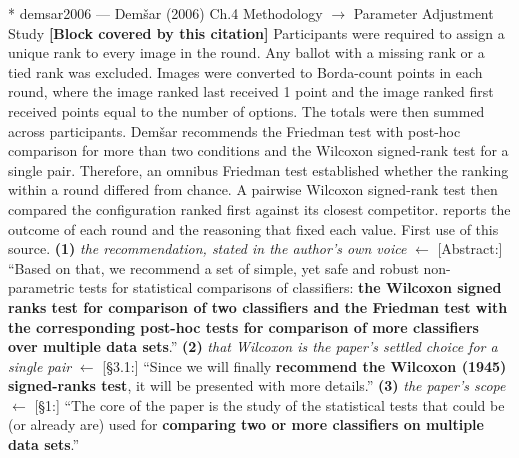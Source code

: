 \documentclass[11pt, a4paper]{article}
\makeatletter
\newcounter{citentry}
\newcommand{\citentry@core}[7]{%
  \stepcounter{citentry}
  \begingroup
  \sbox{\citentry@measurebox}{%
    \begin{minipage}{\linewidth}
      \noindent\colorbox{konstanzblue}{\parbox{\dimexpr\linewidth-2\fboxsep}{%
        \vspace{3pt}
        \textbf{\#\thecitentry \quad #2} \hfill \textit{#3}
        \vspace{3pt}
      }}
      \vspace{3pt}
      \noindent\begin{tabular}{@{}p{2.7cm} p{\dimexpr\linewidth-3cm}@{}}
        \textit{\small Sentence in thesis:} & #4 \\[5pt]
        \textbf{Usage:}\hfill       & #5 \\[5pt]
        \textit{\small Original source:}     & #6 \\[5pt]
        \textbf{How to check:}             & #7 \\
      \end{tabular}
      \vspace{5pt}
      \rule{10pt}{10pt}\quad \textbf{Validated} --- I have read the original and agree it supports the sentence.
    \end{minipage}%
  }%
  \Needspace{\dimexpr\ht\citentry@measurebox+\dp\citentry@measurebox\relax}%
  \endgroup
  \vspace{10pt}
  \noindent\colorbox{konstanzblue}{\parbox{\dimexpr\linewidth-2\fboxsep}{%
    \vspace{3pt}
    \textcolor{white}{\textbf{\#\thecitentry \quad #2}} \hfill \textcolor{white}{\textit{#3}}
    \vspace{3pt}
  }}
  \vspace{3pt}
  \noindent\begin{tabular}{@{}p{2.7cm} p{\dimexpr\linewidth-3cm}@{}}
    \textit{\small Sentence in thesis:} & \textcolor{darkgreen}{#4} \\[5pt]
    \textbf{Usage:}\hfill       & #5 \\[5pt]
    \textit{\small Original source:}     & \textcolor{darkred}{#6} \\[5pt]
    \textbf{How to check:}             & #7 \\
  \end{tabular}
  \vspace{5pt}
  \noindent\CheckBox[name=verified\thecitentry, width=10pt, height=10pt, bordercolor={0 0 0}, borderwidth=0.75, backgroundcolor={1 1 1}#1]{}\quad \textbf{Validated} --- I have read the original and agree it supports the sentence.
  \vspace{3pt}
  \noindent\textcolor{midgray}{\rule{\linewidth}{0.4pt}}
}
\newcommand{\citentry}{\@ifstar{\citentry@core{, checked}}{\citentry@core{}}}
\makeatother
\begin{document}
\begin{Form}
\citentry*
  {demsar2006 --- Dem\v{s}ar (2006)}
  {Ch.4 Methodology $\rightarrow$ Parameter Adjustment Study}
  {\textbf{[Block covered by this citation]} Participants were required to assign a unique rank to every image in the round. Any ballot with a missing rank or a tied rank was excluded. Images were converted to Borda-count points in each round, where the image ranked last received 1 point and the image ranked first received points equal to the number of options. The totals were then summed across participants. Dem\v{s}ar recommends the Friedman test with post-hoc comparison for more than two conditions and the Wilcoxon signed-rank test for a single pair. Therefore, an omnibus Friedman test established whether the ranking within a round differed from chance. A pairwise Wilcoxon signed-rank test then compared the configuration ranked first against its closest competitor. reports the outcome of each round and the reasoning that fixed each value.}
  {First use of this source.}
  {\textbf{(1)} \emph{the recommendation, stated in the author's own voice} $\leftarrow$ [Abstract:] ``Based on that, we recommend a set of simple, yet safe and robust non-parametric tests for statistical comparisons of classifiers: \textbf{the Wilcoxon signed ranks test for comparison of two classifiers and the Friedman test with the corresponding post-hoc tests for comparison of more classifiers over multiple data sets}.'' \quad \textbf{(2)} \emph{that Wilcoxon is the paper's settled choice for a single pair} $\leftarrow$ [\S3.1:] ``Since we will finally \textbf{recommend the Wilcoxon (1945) signed-ranks test}, it will be presented with more details.'' \quad \textbf{(3)} \emph{the paper's scope} $\leftarrow$ [\S1:] ``The core of the paper is the study of the statistical tests that could be (or already are) used for \textbf{comparing two or more classifiers on multiple data sets}.''}

\end{Form}
\end{document}
